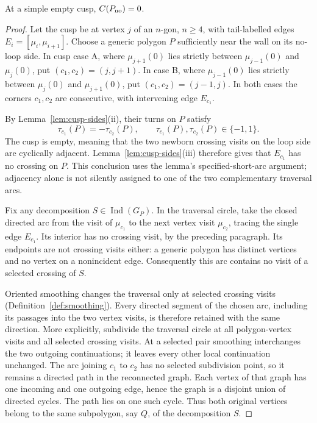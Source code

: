\begin{theorem}\label{thm:C-S5}
At a simple empty cusp, $C(P_{\rm no})=0$.
\end{theorem}
\begin{proof}
Let the cusp be at vertex $j$ of an $n$-gon, $n\geq4$, with tail-labelled
edges $E_i=[\mu_i,\mu_{i+1}]$. Choose a generic polygon $P$ sufficiently
near the wall on its no-loop side. In cusp case A, where
$\mu_{j+1}(0)$ lies strictly between $\mu_{j-1}(0)$ and $\mu_j(0)$,
put $(c_1,c_2)=(j,j+1)$. In case B, where $\mu_{j-1}(0)$ lies strictly
between $\mu_j(0)$ and $\mu_{j+1}(0)$, put $(c_1,c_2)=(j-1,j)$.
In both cases the corners $c_1,c_2$ are consecutive, with intervening
edge $E_{c_1}$.

By Lemma~\ref{lem:cusp-sides}(ii), their turns on $P$ satisfy
\begin{equation}\label{s5pr:opposed-turns}
\tau_{c_1}(P)=-\tau_{c_2}(P),\qquad
\tau_{c_1}(P),\tau_{c_2}(P)\in\{-1,1\}.
\end{equation}
The cusp is empty, meaning that the two newborn crossing visits on the
loop side are cyclically adjacent. Lemma~\ref{lem:cusp-sides}(iii)
therefore gives that $E_{c_1}$ has no crossing on $P$. This conclusion
uses the lemma's specified-short-arc argument; adjacency alone is not
silently assigned to one of the two complementary traversal arcs.

Fix any decomposition $S\in\operatorname{Ind}(G_P)$.
In the traversal circle, take the closed directed arc from the visit
of $\mu_{c_1}$ to the next vertex visit $\mu_{c_2}$, tracing the single
edge $E_{c_1}$. Its interior has no crossing visit, by the preceding
paragraph. Its endpoints are not crossing visits either: a generic
polygon has distinct vertices and no vertex on a nonincident edge.
Consequently this arc contains no visit of a selected crossing of $S$.

Oriented smoothing changes the traversal only at selected crossing
visits (Definition~\ref{def:smoothing}). Every directed segment of the
chosen arc, including its passages into the two vertex visits, is
therefore retained with the same direction. More explicitly, subdivide
the traversal circle at all polygon-vertex visits and all selected
crossing visits. At a selected pair smoothing interchanges the two
outgoing continuations; it leaves every other local continuation
unchanged. The arc joining $c_1$ to $c_2$ has no selected subdivision
point, so it remains a directed path in the reconnected graph. Each
vertex of that graph has one incoming and one outgoing edge, hence the
graph is a disjoint union of directed cycles. The path lies on one
such cycle. Thus both original vertices belong to the same subpolygon,
say $Q$, of the decomposition $S$.


\end{proof}
